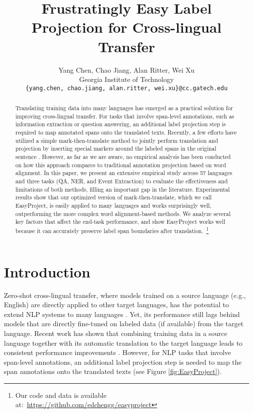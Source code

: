 \documentclass[11pt,dvipsnames]{article}
\title{Frustratingly Easy Label Projection for Cross-lingual Transfer}
\author{Yang Chen, Chao Jiang,  Alan Ritter, Wei Xu \\
  Georgia Institute of Technology \\
 \texttt{\{yang.chen, chao.jiang, alan.ritter, wei.xu\}@cc.gatech.edu} 
\\}
\begin{document}
\maketitle
\begin{abstract}


Translating training data into many languages has emerged as a practical solution for improving cross-lingual transfer. For tasks that involve span-level annotations, such as information extraction or question answering, an additional label projection step is required to map annotated spans onto the translated texts. Recently, a few efforts have utilized a simple mark-then-translate method to jointly perform translation and projection  by inserting special markers around the labeled spans in the original sentence \cite{lewis2020mlqa, hu2020xtreme}. However, as far as we are aware, no empirical analysis has been conducted on how this approach compares to traditional annotation projection based on word alignment. In this paper, we present an extensive empirical study across 57 languages and three  tasks (QA, NER, and Event Extraction) to evaluate the effectiveness and limitations of both methods, filling an important gap in the literature.  Experimental results show that our optimized version of mark-then-translate, which we call EasyProject,  is easily applied to many languages and works surprisingly well, outperforming the more complex word alignment-based methods. We analyze several key factors that affect the end-task performance, and show  EasyProject works well because it can accurately preserve label span boundaries after translation.~\footnote{Our code and data is available at:~\url{https://github.com/edchengg/easyproject}}

\end{abstract}

\section{Introduction}

Zero-shot cross-lingual transfer, where models trained on a source language (e.g., English) are directly applied to other target languages, has the potential to extend NLP systems to many languages \cite{nooralahzadeh-etal-2020-zero, keung-etal-2020-dont,chen2021model, niu-etal-2022-onealigner, huang-etal-2022-multilingual-generative}. Yet, its performance still lags behind models that are directly fine-tuned on labeled data (if available) from the target language.
Recent work has shown that combining training data in a source language together with its automatic translation to the target language leads to consistent performance improvements \cite{xue2021mt5,hu2020xtreme}.
However, for NLP tasks that involve span-level annotations, an additional label projection step is needed to map the span annotations onto the translated texts (see Figure \ref{fig:EasyProject}).
\end{document}
